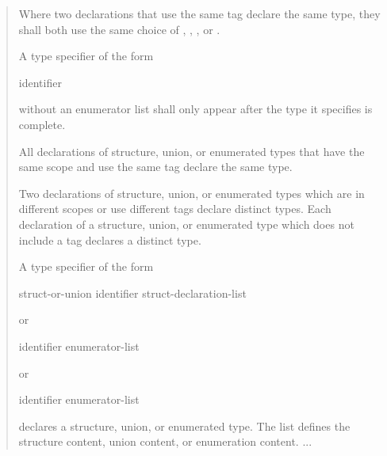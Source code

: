 \begin{quote}
Where two declarations that use the same tag declare the same type,
they shall both use the same choice of
,
,
,
or
.

A type specifier of the form

\begin{bnf}
 
\end{bnf}


\begin{bnf}
 identifier
\end{bnf}

without an enumerator list
shall only appear after the type it specifies is complete.

All declarations of structure, union,
or enumerated types that have the same scope and use the same tag
declare the same type.

Two declarations of structure, union,
or enumerated types which are in different scopes or use different tags
declare distinct types.
Each declaration of a structure, union,
or enumerated type which does not include a tag declares a distinct type.

A type specifier of the form

\begin{bnf}
struct-or-union identifier\opt{} \terminal{\{} struct-declaration-list \terminal{\}}
\end{bnf}


\begin{bnf}
 
\end{bnf}

or

\begin{bnf}
 identifier\opt{} \terminal{\{} enumerator-list \terminal{\}}
\end{bnf}

or

\begin{bnf}
 identifier\opt{} \terminal{\{} enumerator-list \terminal{, \}}
\end{bnf}

declares a structure, union,
or enumerated type.
The list defines the structure content, union content,
or enumeration content. ...
\end{quote}

